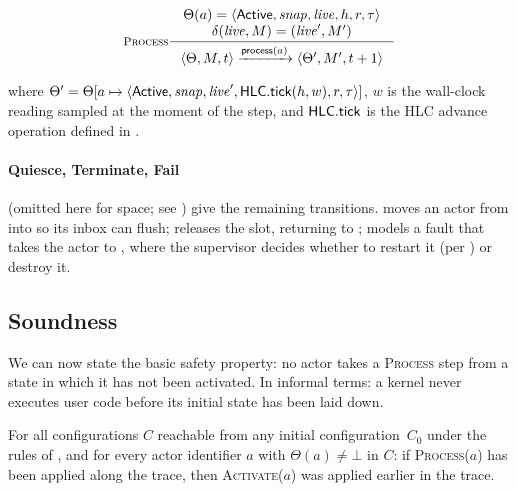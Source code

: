 \begin{equation}
\inference[\textsc{Process}]
{
  \Theta(a) = \langle \Active{}, \mathit{snap}, \mathit{live},
                       h, r, \tau\rangle \\
  \delta(\mathit{live}, M) = (\mathit{live}', M')
}
{
  \langle \Theta, M, t\rangle
  \trans{\mathsf{process}(a)}
  \langle \Theta', M', t+1\rangle
}
\label{rule:process}
\end{equation}

\noindent where
\(\Theta' = \Theta[a \mapsto
  \langle \mathsf{Active}{}, \mathit{snap}, \mathit{live}',
          \mathsf{HLC}.\mathsf{tick}(h, w), r, \tau\rangle]\),
\(w\) is the wall-clock reading sampled at the moment of the
step, and \(\mathsf{HLC}.\mathsf{tick}\) is the HLC advance operation
defined in .

\paragraph{Quiesce, Terminate, Fail}
 (omitted here for space;
see ) give the remaining transitions.
\Quiesce{} moves an actor from \Active{} into \Draining{} so its
inbox can flush; \Terminate{} releases the slot, returning to
\Dormant{}; \Fail{} models a fault that takes the actor to
\Failed{}, where the supervisor decides whether to restart it
(per ) or destroy it.

\subsection{Soundness}
\label{sec:model:soundness}

We can now state the basic safety property: no actor takes a
\textsc{Process} step from a state in which it has not been
activated.  In informal terms: a kernel never executes user code
before its initial state has been laid down.

\begin{theorem}
\label{thm:lifecycle-soundness}
For all configurations \(C\) reachable from any initial
configuration~\(C_0\) under the rules of
, and for every actor identifier \(a\)
with \(\Theta(a) \ne \bot\) in \(C\): if \textsc{Process}(\(a\))
has been applied along the trace, then \textsc{Activate}(\(a\))
was applied earlier in the trace.
\end{theorem}

